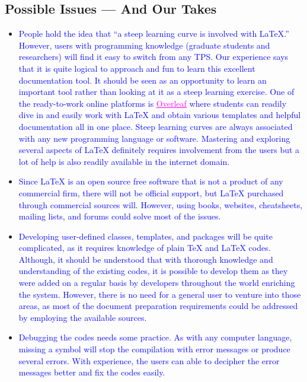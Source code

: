 \documentclass[phd,showgrids]{ndsu-thesis-2022}
\newcommand\italk[1]{\textcolor{blue}{#1}}  %
\newcommand\lx{\LaTeX\xspace}
\newcommand\tx{\TeX\xspace}
\begin{document}
\subsection{Possible Issues --- And Our Takes}
\begin{itemize}[leftmargin=*, itemsep=0pt, parsep=3pt] 
\item \italk{People hold the idea that ``a steep learning curve is involved with \lx.'' However, users with programming knowledge (graduate students and researchers) will find it easy to switch from any TPS. Our experience says that it is quite logical to approach and fun to learn this excellent documentation tool. It should be seen as an opportunity to learn an important tool rather than looking at it as a steep learning exercise. One of the ready-to-work online platforms is \href{https://www.overleaf.com/login}{\textcolor{magenta}{\underline{Overleaf}}} where students can readily dive in and easily work with \lx and obtain various templates and helpful documentation all in one place. Steep learning curves are always associated with any new programming language or software. Mastering and exploring several aspects of \lx definitely requires involvement from the users but a lot of help is also readily available in the internet domain.}   

\item \italk{Since \lx is an open source free software that is not a product of any commercial firm, there will not be official support, but \lx purchased through commercial sources will. However, using books, websites, cheatsheets, mailing lists, and forums could solve most of the issues.} 

\item \italk{Developing user-defined classes, templates, and packages will be quite complicated, as it requires knowledge of plain \tx and \lx codes. Although, it should be understood that with thorough knowledge and understanding of the existing codes, it is possible to develop them as they were added on a regular basis by developers throughout the world enriching the system. However, there is no need for a general user to venture into those areas, as most of the document preparation requirements could be addressed by employing the available sources.} 

\item \italk{Debugging the codes needs some practice. As with any computer language, missing a symbol will stop the compilation with error messages or produce several errors. With experience, the users can able to decipher the error messages better and fix the codes easily.}  


\end{itemize}
\end{document}
